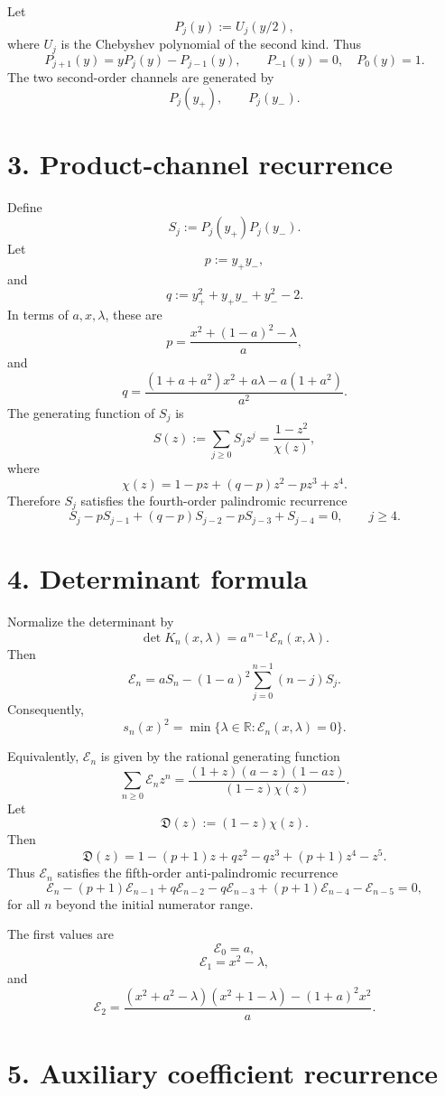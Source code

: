 \documentclass[11pt]{article}
\newcommand{\RR}{\mathbb R}
\begin{document}
Let
\[
P_j(y):=U_j(y/2),
\]
where \(U_j\) is the Chebyshev polynomial of the second kind. Thus
\[
P_{j+1}(y)=yP_j(y)-P_{j-1}(y),
\qquad
P_{-1}(y)=0,\quad P_0(y)=1.
\]
The two second-order channels are generated by
\[
P_j(y_+),\qquad P_j(y_-).
\]

\section*{3. Product-channel recurrence}

Define
\[
S_j:=P_j(y_+)P_j(y_-).
\]
Let
\[
p:=y_+y_-,
\]
and
\[
q:=y_+^2+y_+y_-+y_-^2-2.
\]
In terms of \(a,x,\lambda\), these are
\[
\boxed{
p=
\frac{x^2+(1-a)^2-\lambda}{a},
}
\tag{10}
\]
and
\[
\boxed{
q=
\frac{(1+a+a^2)x^2+a\lambda-a(1+a^2)}{a^2}.
}
\tag{11}
\]
The generating function of \(S_j\) is
\[
\boxed{
S(z):=\sum_{j\ge0}S_jz^j
=
\frac{1-z^2}{\chi(z)},
}
\tag{12}
\]
where
\[
\boxed{
\chi(z)
=
1-pz+(q-p)z^2-pz^3+z^4.
}
\tag{13}
\]
Therefore \(S_j\) satisfies the fourth-order palindromic recurrence
\[
\boxed{
S_j
-pS_{j-1}
+(q-p)S_{j-2}
-pS_{j-3}
+S_{j-4}=0,
\qquad j\ge4.
}
\tag{14}
\]

\section*{4. Determinant formula}

Normalize the determinant by
\[
\det K_n(x,\lambda)=a^{\,n-1}\mathcal E_n(x,\lambda).
\]
Then
\[
\boxed{
\mathcal E_n
=
aS_n
-(1-a)^2
\sum_{j=0}^{n-1}(n-j)S_j.
}
\tag{15}
\]
Consequently,
\[
\boxed{
s_n(x)^2
=
\min\{\lambda\in\RR:\mathcal E_n(x,\lambda)=0\}.
}
\tag{16}
\]

Equivalently, \(\mathcal E_n\) is given by the rational generating function
\[
\boxed{
\sum_{n\ge0}\mathcal E_nz^n
=
\frac{(1+z)(a-z)(1-az)}
{(1-z)\chi(z)}.
}
\tag{17}
\]
Let
\[
\mathfrak D(z):=(1-z)\chi(z).
\]
Then
\[
\boxed{
\mathfrak D(z)
=
1-(p+1)z+qz^2-qz^3+(p+1)z^4-z^5.
}
\tag{18}
\]
Thus \(\mathcal E_n\) satisfies the fifth-order anti-palindromic recurrence
\[
\boxed{
\mathcal E_n
-(p+1)\mathcal E_{n-1}
+q\mathcal E_{n-2}
-q\mathcal E_{n-3}
+(p+1)\mathcal E_{n-4}
-\mathcal E_{n-5}
=0,
}
\tag{19}
\]
for all \(n\) beyond the initial numerator range.

The first values are
\[
\boxed{
\mathcal E_0=a,
}
\tag{20}
\]
\[
\boxed{
\mathcal E_1=x^2-\lambda,
}
\tag{21}
\]
and
\[
\boxed{
\mathcal E_2
=
\frac{
(x^2+a^2-\lambda)(x^2+1-\lambda)
-(1+a)^2x^2
}{a}.
}
\tag{22}
\]

\section*{5. Auxiliary coefficient recurrence}
\end{document}
